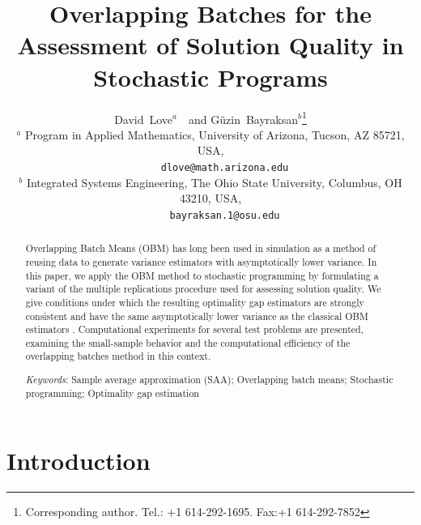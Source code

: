 \documentclass[12pt]{article}
\newcommand{\Keywords}[1]{\par\noindent 
{\small{\em Keywords\/}: #1}}
\begin{document}
\title{Overlapping Batches for the Assessment of Solution Quality in Stochastic Programs}

\author{David~Love$^{a}$\ \ and G\"{u}zin~Bayraksan$^{b}$\thanks{Corresponding author. Tel.: +1 614-292-1695. Fax:+1 614-292-7852}\\[6pt]
{\small
      $^{a}$ Program in Applied Mathematics, University of Arizona, Tucson, AZ 85721, USA,}\\
{\small \ \ \ \ \ \texttt{dlove@math.arizona.edu}} \\
{\small 
      $^{b}$ Integrated Systems Engineering, The Ohio State University, Columbus, OH 43210, USA,}\\
{\small \ \ \ \  \   \texttt{bayraksan.1@osu.edu}}}
\date{}

\maketitle

\begin{abstract}
\noindent Overlapping Batch Means (OBM) has long been used in simulation as a method of reusing data to generate variance estimators with asymptotically lower variance.
In this paper, we apply the OBM method to stochastic programming by formulating a variant of the multiple replications procedure used for assessing solution quality.
We give conditions under which the resulting optimality gap estimators are strongly consistent and have the same asymptotically lower variance as the classical OBM estimators \citep{Meketon1984,Welch1987}.
Computational experiments for several test problems are presented, examining the small-sample behavior and the computational efficiency of the overlapping batches method in this context.\medskip

\Keywords{Sample average approximation (SAA); Overlapping batch means;   Stochastic programming; Optimality gap estimation}
\end{abstract}

\section{Introduction}
\label{sec:intro}
\end{document}
